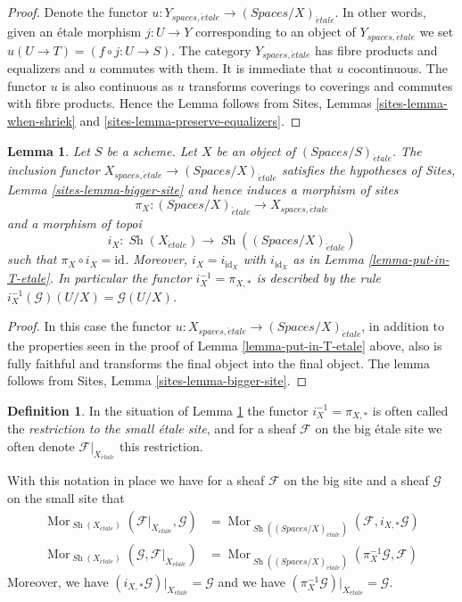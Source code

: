 \documentclass{stacks-project}
\theoremstyle{plain}
\newtheorem{lemma}[subsection]{Lemma}
\theoremstyle{definition}
\newtheorem{definition}[subsection]{Definition}
\theoremstyle{remark}
\numberwithin{equation}{subsection}
\def\Mor{\mathop{\mathrm{Mor}}\nolimits}
\def\Sh{\mathop{\mathit{Sh}}\nolimits}
\def\etale{{\acute{e}tale}}
\begin{document}
\begin{proof}
Denote the functor $u : Y_{spaces, \etale} \to (\textit{Spaces}/X)_\etale$.
In other words, given an \'etale morphism $j : U \to Y$ corresponding
to an object of $Y_{spaces, \etale}$ we set
$u(U \to T) = (f \circ j : U \to S)$.
The category $Y_{spaces, \etale}$
has fibre products and equalizers and $u$ commutes with them.
It is immediate that $u$ cocontinuous.
The functor $u$ is also continuous as $u$ transforms coverings to coverings and
commutes with fibre products. Hence the Lemma follows from
Sites, Lemmas \ref{sites-lemma-when-shriek}
and \ref{sites-lemma-preserve-equalizers}.
\end{proof}

\begin{lemma}
\label{lemma-at-the-bottom-etale}
Let $S$ be a scheme. Let $X$ be an object of $(\textit{Spaces}/S)_\etale$.
The inclusion functor $X_{spaces, \etale} \to (\textit{Spaces}/X)_\etale$
satisfies the hypotheses of Sites, Lemma \ref{sites-lemma-bigger-site}
and hence induces a morphism of sites
$$
\pi_X :
(\textit{Spaces}/X)_\etale
\longrightarrow
X_{spaces, \etale}
$$
and a morphism of topoi
$$
i_X :
\Sh(X_\etale)
\longrightarrow
\Sh((\textit{Spaces}/X)_\etale)
$$
such that $\pi_X \circ i_X = \text{id}$. Moreover, $i_X = i_{\text{id}_X}$
with $i_{\text{id}_X}$ as in Lemma \ref{lemma-put-in-T-etale}.
In particular the functor $i_X^{-1} = \pi_{X, *}$ is described by the rule
$i_X^{-1}(\mathcal{G})(U/X) = \mathcal{G}(U/X)$.
\end{lemma}

\begin{proof}
In this case the functor
$u : X_{spaces, \etale} \to (\textit{Spaces}/X)_\etale$,
in addition to the properties seen in the proof of
Lemma \ref{lemma-put-in-T-etale} above, also is fully faithful
and transforms the final object into the final object.
The lemma follows from Sites, Lemma \ref{sites-lemma-bigger-site}.
\end{proof}

\begin{definition}
\label{definition-restriction-small-etale}
In the situation of Lemma \ref{lemma-at-the-bottom-etale}
the functor $i_X^{-1} = \pi_{X, *}$ is often
called the {\it restriction to the small \'etale site}, and for a sheaf
$\mathcal{F}$ on the big \'etale site we often denote
$\mathcal{F}|_{X_\etale}$ this restriction.
\end{definition}

\noindent
With this notation in place we have for a sheaf $\mathcal{F}$ on the
big site and a sheaf $\mathcal{G}$ on the small site that
\begin{align*}
\Mor_{\Sh(X_\etale)}(
\mathcal{F}|_{X_\etale},
\mathcal{G})
& =
\Mor_{\Sh((\textit{Spaces}/X)_\etale)}(
\mathcal{F},
i_{X, *}\mathcal{G}) \\
\Mor_{\Sh(X_\etale)}(
\mathcal{G},
\mathcal{F}|_{X_\etale})
& =
\Mor_{\Sh((\textit{Spaces}/X)_\etale)}(
\pi_X^{-1}\mathcal{G},
\mathcal{F})
\end{align*}
Moreover, we have $(i_{X, *}\mathcal{G})|_{X_\etale} = \mathcal{G}$
and we have $(\pi_X^{-1}\mathcal{G})|_{X_\etale} = \mathcal{G}$.
\end{document}
